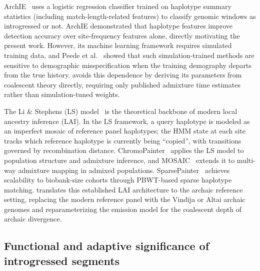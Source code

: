 ArchIE~\citep{durvasula2019statistical} uses a logistic regression classifier trained on
haplotype summary statistics (including match-length-related features) to classify
genomic windows as introgressed or not.
ArchIE demonstrated that haplotype features improve detection accuracy over
site-frequency features alone, directly motivating the present work.
However, its machine learning framework requires simulated training data, and
Peede et al.~\citeyear{peede2026review} showed that such simulation-trained
methods are sensitive to demographic misspecification when the training
demography departs from the true history.
\AP{} avoids this dependence by deriving its parameters from coalescent theory
directly, requiring only published admixture time estimates rather than
simulation-tuned weights.

The Li \& Stephens (LS) model~\citep{li2003modeling} is the theoretical backbone
of modern local ancestry inference (LAI).
In the LS framework, a query haplotype is modeled as an imperfect mosaic of
reference panel haplotypes; the HMM state at each site tracks which reference
haplotype is currently being ``copied'', with transitions governed by recombination
distance.
ChromoPainter~\citep{lawson2012inference} applies the LS model to population
structure and admixture inference, and MOSAIC~\citep{salter2019mosaic} extends
it to multi-way admixture mapping in admixed populations.
SparsePainter~\citep{yang2025sparsepainter} achieves scalability to biobank-size
cohorts through PBWT-based sparse haplotype matching.
\AP{} translates this established LAI architecture to the archaic reference
setting, replacing the modern reference panel with the Vindija or Altai archaic
genomes and reparameterizing the emission model for the coalescent depth of
archaic divergence.

\subsection*{Functional and adaptive significance of introgressed segments}

